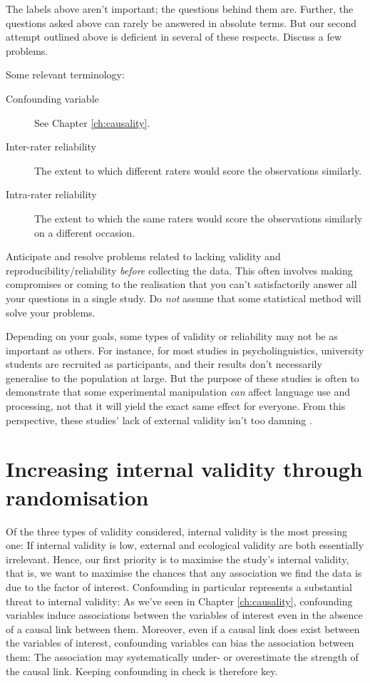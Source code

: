 \documentclass[a4paper]{tufte-book}\usepackage[]{graphicx}\usepackage[]{xcolor}
\begin{document}
The labels above aren't important; the questions behind them are.
Further, the questions asked above can rarely be answered in absolute terms.
But our second attempt outlined above is deficient in several of these respects. 
Discuss a few problems.

\bigskip

Some relevant terminology:

\begin{description}
 \item [Confounding variable] See Chapter \ref{ch:causality}.
 \item [Inter-rater reliability] The extent to which different raters would score the observations similarly.
 \item [Intra-rater reliability] The extent to which the same raters would score the observations 
 similarly on a different occasion.
\end{description}

\begin{framed}
 Anticipate and resolve problems
related to lacking validity and reproducibility/reliability
\emph{before} collecting the data. This often
involves making compromises or coming to the
realisation that you can't satisfactorily
answer all your questions in a single study.
Do \emph{not} assume that some statistical method
will solve your problems.
\end{framed}

Depending on your goals, some types of validity
or reliability may not be as important as others.
For instance, for most studies in psycholinguistics,
university students are recruited as participants,
and their results don't necessarily generalise
to the population at large. But the purpose of these
studies is often to demonstrate that some
experimental manipulation \emph{can} affect
language use and processing, not that
it will yield the exact same effect for everyone.
From this perspective, these studies' lack
of external validity isn't too damning \citep{Mook1983}.

\section{Increasing internal validity through randomisation}
Of the three types of validity considered, 
internal validity is the most pressing one:
If internal validity is low, external and ecological validity are both
essentially irrelevant.
Hence,
our first priority is to maximise the study's internal validity, that is,
we want to maximise the chances that any association we find the data
is due to the factor of interest.
Confounding in particular represents a substantial threat to internal validity:
As we've seen in Chapter \ref{ch:causality}, confounding variables induce
associations between the variables of interest even in the absence of a causal
link between them. Moreover, even if a causal link does exist between the
variables of interest, confounding variables can bias the association
between them: The association may systematically under- or overestimate the
strength of the causal link. Keeping confounding in check is therefore key.
\end{document}
